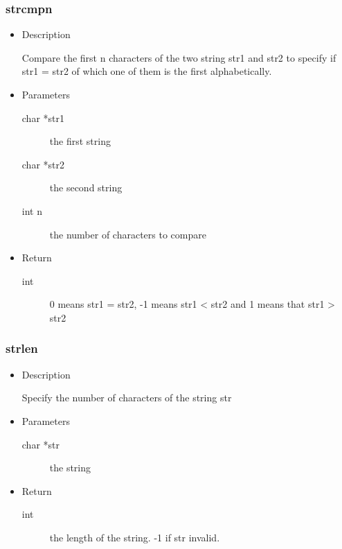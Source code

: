 \subsubsection{strcmpn}
\begin{itemize}
\item{Description}

	Compare the first n characters of the two string str1 and str2 to
	specify if str1 = str2 of which one of them is the first alphabetically.
\item{Parameters}
	\begin{description}
	\item[char *str1] the first string
	\item[char *str2] the second string
	\item[int n] the number of characters to compare
	\end{description}
\item{Return}
	\begin{description}
	\item[int] 0 means str1 = str2, -1 means str1 < str2 and 1 means that
		str1 > str2
	\end{description}
\end{itemize}

\subsubsection{strlen}
\begin{itemize}
\item{Description}

	Specify the number of characters of the string str
\item{Parameters}
	\begin{description}
	\item[char *str] the string
	\end{description}
\item{Return}
	\begin{description}
	\item[int]	the length of the string. -1 if str invalid.
	\end{description}
\end{itemize}

